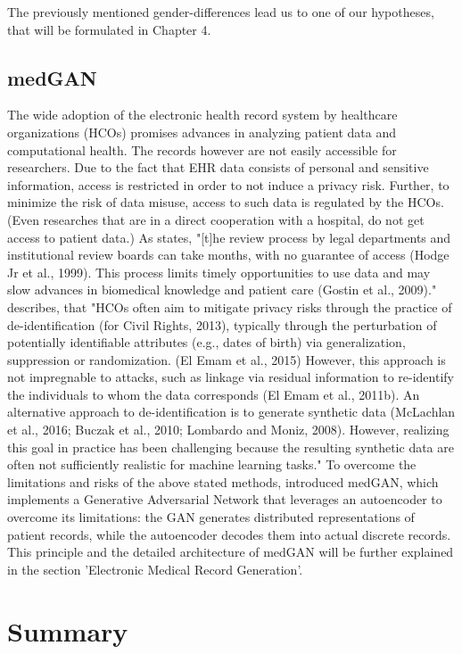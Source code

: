 \documentclass[11pt, a4paper]{book}
\begin{document}
The previously mentioned gender-differences lead us to one of our hypotheses, that will be formulated in Chapter 4.

\subsection{medGAN}
The wide adoption of the electronic health record system by healthcare organizations (HCOs) promises advances in analyzing patient data and computational health. The records however are not easily accessible for researchers. Due to the fact that EHR data consists of personal and sensitive information, access is restricted in order to not induce a privacy risk. Further, to minimize the risk of data misuse, access to such data is regulated by the HCOs. \citep{Choi2017}
(Even researches that are in a direct cooperation with a hospital, do not get access to patient data.)
 As \citep{Choi2017} states, "[t]he review process by legal departments and institutional review boards can take months, with no guarantee of access (Hodge Jr et al., 1999). This process limits timely opportunities to use data and may slow advances in biomedical knowledge and patient care (Gostin et al., 2009)."
 \citep{Choi2017} describes, that "HCOs often aim to mitigate privacy risks through the practice of de-identification (for Civil Rights, 2013), typically through the perturbation of potentially identifiable attributes (e.g., dates of birth) via generalization, suppression or randomization. (El Emam et al., 2015) However, this approach is not impregnable to attacks, such as linkage via residual information to re-identify the individuals to whom the data corresponds (El Emam et al., 2011b). An alternative approach to de-identification is to generate synthetic data (McLachlan et al., 2016; Buczak et al., 2010; Lombardo and Moniz, 2008). However, realizing this goal in practice has been challenging because the resulting synthetic data are often not sufficiently realistic for machine learning tasks."  \cite{Choi2017}
 To overcome the limitations and risks of the above stated methods, \citep{Choi2017} introduced medGAN, which implements a Generative Adversarial Network that leverages an autoencoder to overcome its limitations: the GAN generates distributed representations of patient records, while the autoencoder decodes them into actual discrete records.
 This principle and the detailed architecture of medGAN will be further explained in the section 'Electronic Medical Record Generation'.

\section{Summary}
\end{document}
